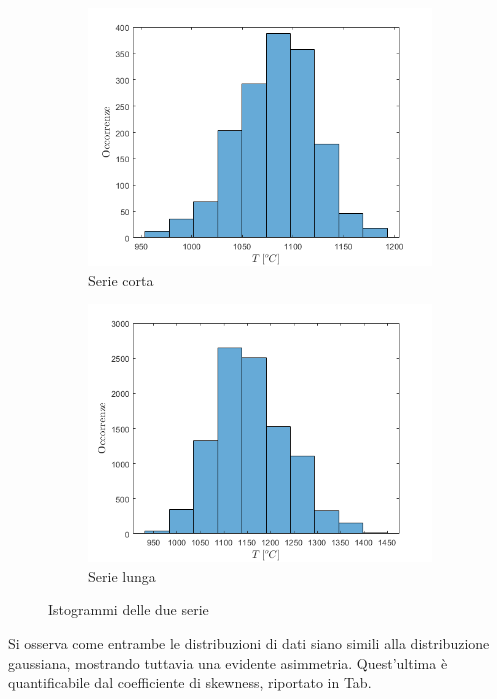 \begin{figure} [H]
	
	\begin{subfigure}{0.49\textwidth}
		\centering
		\includegraphics[width=0.99\linewidth]{chapters/1-misureT/istogrammashort}
		\caption{Serie corta}
		\label{fig:istogrammashort}
	\end{subfigure}%
	\begin{subfigure}{0.49\textwidth}
		\centering
		\includegraphics[width=0.99\linewidth]{chapters/1-misureT/istogrammalong}
		\caption{Serie lunga}
		\label{fig:istogrammalong}
	\end{subfigure}
\caption{Istogrammi delle due serie}	
\label{fig:istboth}
\end{figure}
Si osserva come entrambe le distribuzioni di dati siano simili alla distribuzione gaussiana, mostrando tuttavia una evidente asimmetria. Quest'ultima è quantificabile dal coefficiente di skewness, riportato in Tab.%
